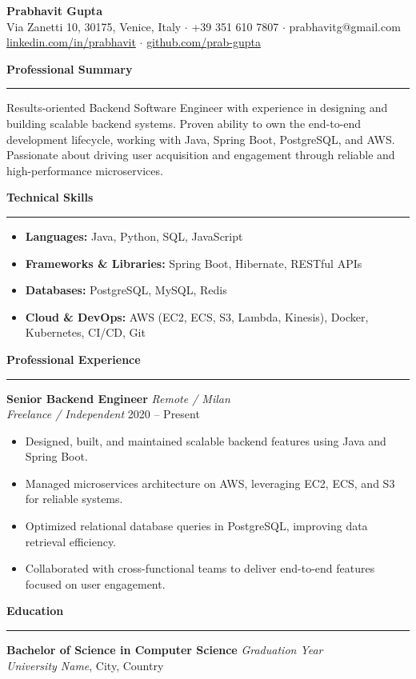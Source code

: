 \documentclass[11pt,a4paper]{article}
\begin{document}
\begin{center}
    {\Huge \textbf{Prabhavit Gupta}} \\
    \vspace{2mm}
    Via Zanetti 10, 30175, Venice, Italy $\cdot$ +39 351 610 7807 $\cdot$ prabhavitg@gmail.com \\
    \href{https://www.linkedin.com/in/prabhavit/}{linkedin.com/in/prabhavit} $\cdot$ \href{https://github.com/prab-gupta}{github.com/prab-gupta}
\end{center}

\vspace{5mm}
\noindent \textbf{\Large Professional Summary} \\
\rule{\textwidth}{0.4pt}
Results-oriented Backend Software Engineer with experience in designing and building scalable backend systems. Proven ability to own the end-to-end development lifecycle, working with Java, Spring Boot, PostgreSQL, and AWS. Passionate about driving user acquisition and engagement through reliable and high-performance microservices.

\vspace{5mm}
\noindent \textbf{\Large Technical Skills} \\
\rule{\textwidth}{0.4pt}
\begin{itemize}[leftmargin=*]
    \item \textbf{Languages:} Java, Python, SQL, JavaScript
    \item \textbf{Frameworks \& Libraries:} Spring Boot, Hibernate, RESTful APIs
    \item \textbf{Databases:} PostgreSQL, MySQL, Redis
    \item \textbf{Cloud \& DevOps:} AWS (EC2, ECS, S3, Lambda, Kinesis), Docker, Kubernetes, CI/CD, Git
\end{itemize}

\vspace{5mm}
\noindent \textbf{\Large Professional Experience} \\
\rule{\textwidth}{0.4pt}
\textbf{Senior Backend Engineer} \hfill \textit{Remote / Milan} \\
\textit{Freelance / Independent} \hfill 2020 -- Present
\begin{itemize}[leftmargin=*]
    \item Designed, built, and maintained scalable backend features using Java and Spring Boot.
    \item Managed microservices architecture on AWS, leveraging EC2, ECS, and S3 for reliable systems.
    \item Optimized relational database queries in PostgreSQL, improving data retrieval efficiency.
    \item Collaborated with cross-functional teams to deliver end-to-end features focused on user engagement.
\end{itemize}

\vspace{5mm}
\noindent \textbf{\Large Education} \\
\rule{\textwidth}{0.4pt}
\textbf{Bachelor of Science in Computer Science} \hfill \textit{Graduation Year} \\
\textit{University Name}, City, Country
\end{document}
